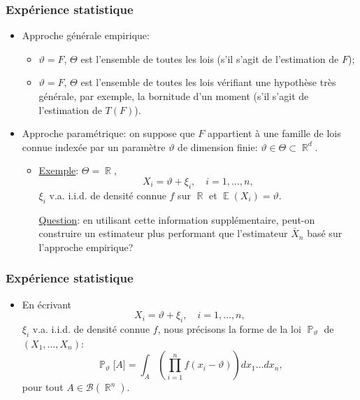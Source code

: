 ﻿\documentclass{beamer}
\DeclareMathOperator{\E}{{\mathbb E}}
\DeclareMathOperator{\R}{{\mathbb R}}
\DeclareMathOperator{\PP}{{\mathbb P}}
\begin{document}
\begin{frame}
\frametitle{Expérience statistique}
\begin{itemize}
\item Approche g\'en\'erale empirique:
\begin{itemize}
\item $\vartheta=F$, $\Theta$ est l'ensemble de
toutes les lois (s'il s'agit de l'estimation de $F$);
\item $\vartheta=F$, $\Theta$ est l'ensemble de
toutes les lois v\'erifiant une hypoth\`ese tr\`es g\'en\'erale, par
exemple, la bornitude d'un moment (s'il s'agit de l'estimation de
$T(F)$).
\end{itemize}
\item Approche param\'etrique: {\color{red} on suppose} que $F$ appartient \`a une
{\color{red} famille de lois connue} index\'ee par un param\`etre
$\vartheta$ de dimension finie: $\vartheta\in \Theta \subset \R^d$.
\begin{itemize}
\item \underline{Exemple}: $\Theta = \R$,
$$ X_i= \vartheta +\xi_i, \quad i=1,\dots,n,$$
$\xi_i$ v.a. i.i.d. de densit\'e {\color{red} connue} $f$ sur $\R$
et $\E(X_i)=\vartheta$.

\underline{Question}: en utilisant cette information
suppl\'ementaire, peut-on construire un estimateur plus performant
que l'estimateur $\bar X_n$ bas\'e sur l'approche empirique?
\end{itemize}
%
\end{itemize}
\end{frame}


\begin{frame}
\frametitle{Expérience statistique}
\begin{itemize}
\item En \'ecrivant
$$ X_i= \vartheta +\xi_i, \quad i=1,\dots,n,$$
$\xi_i$ v.a. i.i.d. de densit\'e {\color{red} connue} $f$, nous
pr\'ecisons la forme de la loi $\PP_{\vartheta}$ de
$(X_1,\dots,X_n)$:
$$\PP_\vartheta\big[A\big] = \int_A
\left(\prod_{i=1}^n f(x_i-\vartheta)\right) dx_1\ldots dx_n,
$$
pour tout $A\in {\mathcal B}(\R^n)$.
\end{itemize}
\end{frame}
\end{document}

